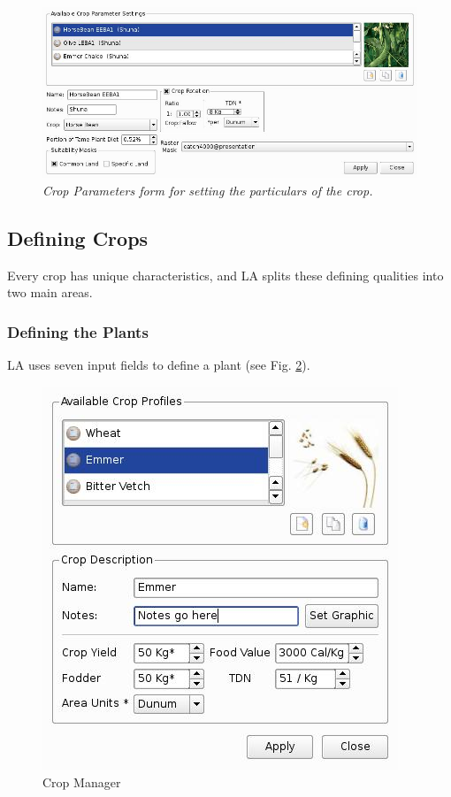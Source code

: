     \begin{figure}[htbp] %
      \includegraphics[scale=.28]{./images/cropParameters.jpg}
      \caption[Crop Parameters]{\label{fig:cropParameters}\textit{Crop
        Parameters form for setting the particulars of the crop.}}
    \end{figure}

\subsection{Defining Crops}Every crop has unique
characteristics, and LA splits these defining qualities into two
main areas.
  \subsubsection{Defining the Plants}LA uses seven input fields to define a plant (see Fig.
  \ref{fig:cropManager}).

   \begin{figure}[htbp]
     \includegraphics[scale=.6]{./images/cropManager.jpg}
      \caption{\label{fig:cropManager}Crop Manager}
    \end{figure}

